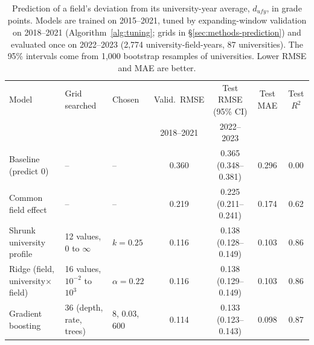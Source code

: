 \begin{table}[t]
\centering
\caption{Prediction of a field's deviation from its university-year average, $d_{ufy}$, in grade points. Models are trained on 2015--2021, tuned by expanding-window validation on 2018--2021 (Algorithm~\ref{alg:tuning}; grids in \S\ref{sec:methods-prediction}) and evaluated once on 2022--2023 (2,774 university-field-years, 87 universities). The 95\% intervals come from 1,000 bootstrap resamples of universities. Lower RMSE and MAE are better.}
\label{tab:models}
\footnotesize
\setlength{\tabcolsep}{3.5pt}
\begin{tabular}{@{}lllcccc@{}}
\toprule
Model & Grid searched & Chosen & Valid.\ RMSE & Test RMSE (95\% CI) & Test MAE & Test $R^2$ \\
 & & & 2018--2021 & 2022--2023 & & \\
\midrule
Baseline (predict 0) & -- & -- & 0.360 & 0.365 (0.348--0.381) & 0.296 & 0.00 \\
Common field effect & -- & -- & 0.219 & 0.225 (0.211--0.241) & 0.174 & 0.62 \\
Shrunk university profile & 12 values, 0 to $\infty$ & $k = 0.25$ & 0.116 & 0.138 (0.128--0.149) & 0.103 & 0.86 \\
Ridge (field, university$\times$field) & 16 values, $10^{-2}$ to $10^{3}$ & $\alpha = 0.22$ & 0.116 & 0.138 (0.129--0.149) & 0.103 & 0.86 \\
Gradient boosting & 36 (depth, rate, trees) & 8, 0.03, 600 & 0.114 & 0.133 (0.123--0.143) & 0.098 & 0.87 \\
\bottomrule
\end{tabular}
\end{table}

